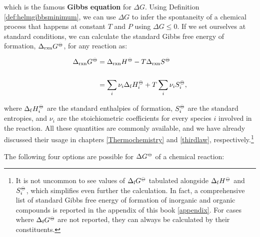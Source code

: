 \documentclass[
  9pt,
]{extbook}
\theoremstyle{definition}
\theoremstyle{definition}
\theoremstyle{definition}
\theoremstyle{remark}
\begin{document}
which is the famous \textbf{Gibbs equation} for \(\Delta G\). Using Definition \ref{def:helmgibbsminimum}, we can use \(\Delta G\) to infer the spontaneity of a chemical process that happens at constant \(T\) and \(P\) using \(\Delta G \leq 0\). If we set ourselves at standard conditions, we can calculate the standard Gibbs free energy of formation, \(\Delta_{\text{rxn}} G^{-\kern-6pt{\ominus}\kern-6pt-}\), for any reaction as:

\begin{equation}
\begin{aligned}
\Delta_{\text{rxn}} G^{-\kern-6pt{\ominus}\kern-6pt-}&= \Delta_{\text{rxn}} H^{-\kern-6pt{\ominus}\kern-6pt-}-T \Delta_{\text{rxn}} S^{-\kern-6pt{\ominus}\kern-6pt-}\\
\\
&= \sum_i \nu_i \Delta_{\mathrm{f}} H_i^{-\kern-6pt{\ominus}\kern-6pt-}+ T \sum_i \nu_i S_i^{-\kern-6pt{\ominus}\kern-6pt-},
\end{aligned}
\label{eq:gibbseq2}
\end{equation}

where \(\Delta_{\mathrm{f}} H_i^{-\kern-6pt{\ominus}\kern-6pt-}\) are the standard enthalpies of formation, \(S_i^{-\kern-6pt{\ominus}\kern-6pt-}\) are the standard entropies, and \(\nu_i\) are the stoichiometric coefficients for every species \(i\) involved in the reaction. All these quantities are commonly available, and we have already discussed their usage in chapters \ref{Thermochemistry} and \ref{thirdlaw}, respectively.\footnote{It is not uncommon to see values of \(\Delta_{\text{f}} G^{-\kern-6pt{\ominus}\kern-6pt-}\) tabulated alongside \(\Delta_{\mathrm{f}} H^{-\kern-6pt{\ominus}\kern-6pt-}\) and \(S_i^{-\kern-6pt{\ominus}\kern-6pt-}\), which simplifies even further the calculation. In fact, a comprehensive list of standard Gibbs free energy of formation of inorganic and organic compounds is reported in the appendix of this book \ref{appendix}. For cases where \(\Delta_{\text{f}} G^{-\kern-6pt{\ominus}\kern-6pt-}\) are not reported, they can always be calculated by their constituents.}

The following four options are possible for \(\Delta G^{-\kern-6pt{\ominus}\kern-6pt-}\) of a chemical reaction:
\end{document}

